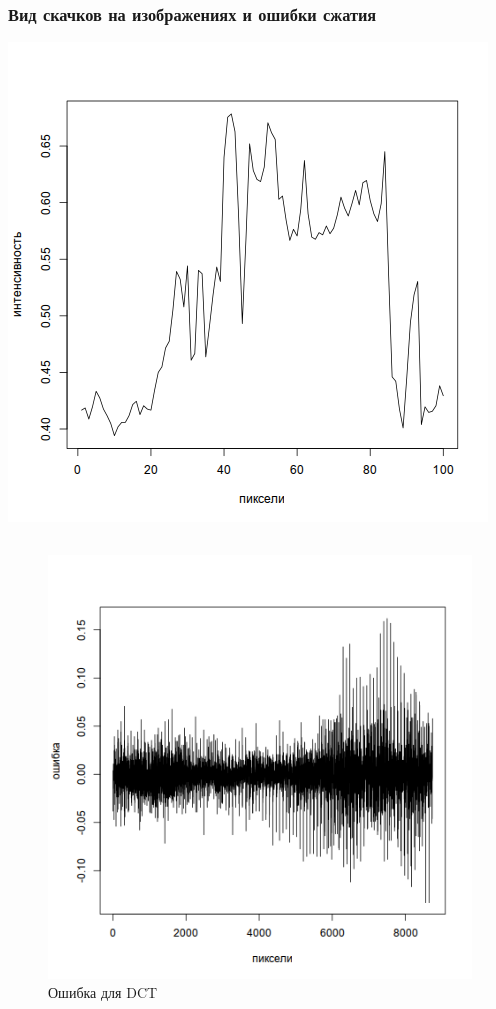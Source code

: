 \documentclass{beamer}
\begin{document}
\begin{frame}
\frametitle{Вид скачков на изображениях и ошибки сжатия}

\begin{center}
  \includegraphics[height=0.4\textheight]{img/field/imageplot}
\end{center}
\begin{columns}[T]
  \begin{column}{0.45\textwidth}
    \begin{figure}
      \includegraphics[height=0.3\textheight]{img/field/diffplot_jpeg}
      \caption{Ошибка для DCT}
    \end{figure}
  \end{column}


\end{columns}
\end{frame}
\end{document}
